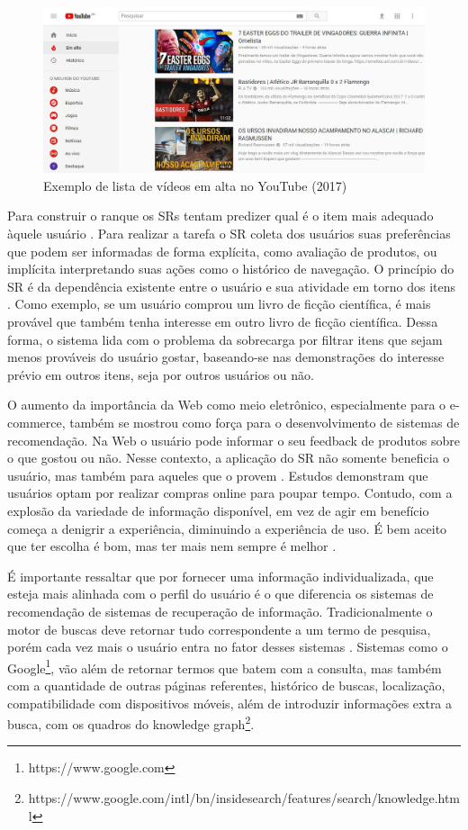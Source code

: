 \begin{figure}
	\centering
	\includegraphics[scale=0.50]{imagens/youtube.jpg}
	\caption{Exemplo de lista de vídeos em alta no YouTube (2017)}
	\label{fig:youtube_em_alta}
\end{figure} 

Para construir o ranque os SRs tentam predizer qual é o item mais adequado àquele usuário \citep{Ricci2011}. Para realizar a tarefa o SR coleta dos usuários suas preferências que podem ser informadas de forma explícita, como avaliação de produtos, ou implícita interpretando suas ações como o histórico de navegação. O princípio do SR é da dependência existente entre o usuário e sua atividade em torno dos itens \citep{Aggarwal:Intro:2016}. Como exemplo, se um usuário comprou um livro de ficção científica, é mais provável que também tenha interesse em outro livro de ficção científica. Dessa forma, o sistema lida com o problema da sobrecarga por filtrar itens que sejam menos prováveis do usuário gostar, baseando-se nas demonstrações do interesse prévio em outros itens, seja por outros usuários ou não.

O aumento da importância da Web como meio eletrônico, especialmente para o e-commerce, também se mostrou como força para o desenvolvimento de sistemas de recomendação.  Na Web o usuário pode informar o seu feedback de produtos sobre o que gostou ou não. Nesse contexto, a aplicação do SR não somente beneficia o usuário, mas também para aqueles que o provem \citep{ ISINKAYE2015261}. Estudos \citep{Mykolas:2015a} demonstram que usuários optam por realizar compras online para poupar tempo. Contudo, com a explosão da variedade de informação disponível, em vez de agir em benefício começa a denigrir a experiência, diminuindo a experiência de uso. É bem aceito que ter escolha é bom, mas ter mais nem sempre é melhor \citep{Ricci2011}.

É importante ressaltar que por fornecer uma informação individualizada, que esteja mais alinhada com o perfil do usuário é o que diferencia os sistemas de recomendação de sistemas de recuperação de informação. Tradicionalmente o motor de buscas deve retornar tudo correspondente a um termo de pesquisa, porém cada vez mais o usuário entra no fator desses sistemas \citep{Burke:2002:HRS:586321.586352}. Sistemas como o Google\footnote{https://www.google.com}, vão além de retornar termos que batem com a consulta, mas também com a quantidade de outras páginas referentes, histórico de buscas, localização, compatibilidade com dispositivos móveis, além de introduzir informações extra a busca, com os quadros do knowledge graph\footnote{ https://www.google.com/intl/bn/insidesearch/features/search/knowledge.html}.

